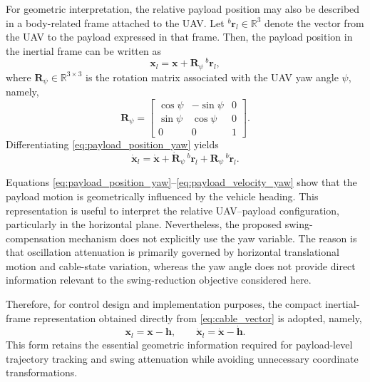 \documentclass[sn-mathphys-num]{sn-jnl}
\theoremstyle{thmstyleone}%
\theoremstyle{thmstyletwo}%
\theoremstyle{thmstylethree}%
\begin{document}
For geometric interpretation, the relative payload position may also be described in a body-related frame attached to the UAV. Let ${}^{b}\mathbf{r}_l\in\mathbb{R}^3$ denote the vector from the UAV to the payload expressed in that frame. Then, the payload position in the inertial frame can be written as
\begin{equation}
\mathbf{x}_l = \mathbf{x} + \mathbf{R}_{\psi}\,{}^{b}\mathbf{r}_l,
\label{eq:payload_position_yaw}
\end{equation}
where $\mathbf{R}_{\psi}\in\mathbb{R}^{3\times 3}$ is the rotation matrix associated with the UAV yaw angle $\psi$, namely,
\begin{equation}
\mathbf{R}_{\psi}=
\begin{bmatrix}
\cos\psi & -\sin\psi & 0\\
\sin\psi & \cos\psi  & 0\\
0        & 0         & 1
\end{bmatrix}.
\label{eq:yaw_rotation}
\end{equation}
Differentiating \eqref{eq:payload_position_yaw} yields
\begin{equation}
\dot{\mathbf{x}}_l
=
\dot{\mathbf{x}}
+
\dot{\mathbf{R}}_{\psi}\,{}^{b}\mathbf{r}_l
+
\mathbf{R}_{\psi}\,{}^{b}\dot{\mathbf{r}}_l.
\label{eq:payload_velocity_yaw}
\end{equation}

Equations \eqref{eq:payload_position_yaw}--\eqref{eq:payload_velocity_yaw} show that the payload motion is geometrically influenced by the vehicle heading. This representation is useful to interpret the relative UAV--payload configuration, particularly in the horizontal plane. Nevertheless, the proposed swing-compensation mechanism does not explicitly use the yaw variable. The reason is that oscillation attenuation is primarily governed by horizontal translational motion and cable-state variation, whereas the yaw angle does not provide direct information relevant to the swing-reduction objective considered here.

Therefore, for control design and implementation purposes, the compact inertial-frame representation obtained directly from \eqref{eq:cable_vector} is adopted, namely,
\begin{equation}
\mathbf{x}_l = \mathbf{x} - \mathbf{h},
\qquad
\dot{\mathbf{x}}_l = \dot{\mathbf{x}} - \dot{\mathbf{h}}.
\label{eq:payload_velocity_compact}
\end{equation}
This form retains the essential geometric information required for payload-level trajectory tracking and swing attenuation while avoiding unnecessary coordinate transformations.
\end{document}
